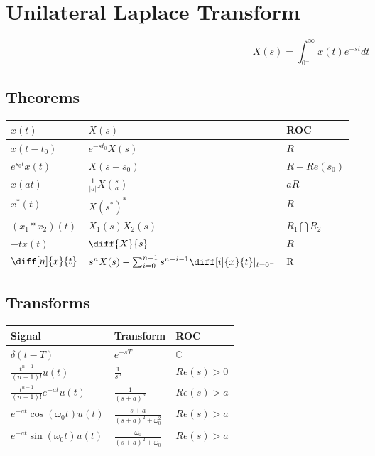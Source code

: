 

\section*{Unilateral Laplace Transform}
$$X(s) = \int_{0^-}^\infty{x(t)e^{-st}dt}$$
\subsection*{Theorems}
\begin{center}
    \begin{tabularx}{\textwidth}{XXX}
        \hline
	$x(t)$ & $X(s)$ & ROC\\
        \hline
	$x(t-t_0)$ & $e^{-st_0}X(s)$ & $R$\\
	$e^{s_0t}x(t)$ & $X(s-s_0)$ & $R + Re(s_0)$\\
	$x(at)$ & $\frac{1}{|a|}X\left( \frac{s}{a} \right)$ & $aR$\\
	$x^*(t)$ & $X(s^*)^*$ & $R$\\
      $(x_1*x_2)(t)$ & $X_1(s)X_2(s)$ & $R_1\bigcap R_2$\\
      $-tx(t)$ & $\diff{X}{s}$ & $R$\\
      $\diff[n]{x}{t}$ & $s^nX(s)-\sum_{i=0}^{n-1}s^{n-i-1}\diff[i]{x}{t}|_{t=0^-}$ & R
    \end{tabularx}
\end{center}
\subsection*{Transforms}
\begin{center}
    \begin{tabularx}{\textwidth}{XXX}
        \hline
        Signal & Transform & ROC\\
        \hline
	$\delta(t-T)$ & $e^{-sT}$ & $\mathbb{C}$\\
	$\frac{t^{n-1}}{(n-1)!}u(t)$ & $\frac{1}{s^n}$ & $Re(s)>0$\\
	$\frac{t^{n-1}}{(n-1)!}e^{-at}u(t)$ & $\frac{1}{(s+a)^n}$ & $Re(s) > a$\\
	$e^{-at}\cos(\omega_0t)u(t)$ & $\frac{s+a}{(s+a)^2+\omega_0^2}$ & $Re(s) > a$\\
	$e^{-at}\sin(\omega_0t)u(t)$ & $\frac{\omega_0}{(s+a)^2+\omega_0}$ & $Re(s) > a$
    \end{tabularx}
\end{center}

